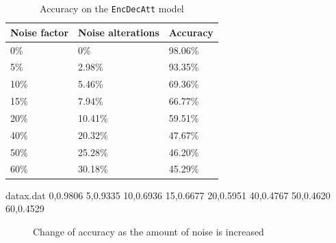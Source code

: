 \begin{table}[H]
    \centering
    \begin{tabular}{|l|l|l|}
        \hline 
        \textbf{Noise factor}          & \textbf{Noise alterations}       & \textbf{Accuracy}         \\ \hline
        0\%                            & 0\%                              & 98.06\%                   \\ \hline
        5\%                            & 2.98\%                           & 93.35\%                   \\ \hline
        10\%                           & 5.46\%                           & 69.36\%                   \\ \hline
        15\%                           & 7.94\%                           & 66.77\%                   \\ \hline
        20\%                           & 10.41\%                          & 59.51\%                   \\ \hline
        40\%                           & 20.32\%                          & 47.67\%                   \\ \hline
        50\%                           & 25.28\%                          & 46.20\%                   \\ \hline
        60\%                           & 30.18\%                          & 45.29\%                   \\ \hline
    \end{tabular}
    \caption{Accuracy on the {\tt EncDecAtt} model}
    \label{table:noise_accuracy}
\end{table}

\begin{filecontents}{datax.dat}
0,0.9806
5,0.9335
10,0.6936
15,0.6677
20,0.5951
40,0.4767
50,0.4620
60,0.4529
\end{filecontents}

\begin{figure}[H]
    \centering
    \captionsetup{justification=centering}
    \caption{Change of accuracy as the amount of noise is increased}
    \label{fig:noise_accuracy}
\end{figure}

